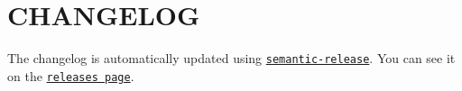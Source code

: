 \chapter{CHANGELOG }
\hypertarget{md__c_1_2_users_2saket_2_one_drive_2_desktop_2e_pathshala_2epathshala-_web_2node__modules_2babel887a031c2d65df9e233e1c16221b35d1}{}\label{md__c_1_2_users_2saket_2_one_drive_2_desktop_2e_pathshala_2epathshala-_web_2node__modules_2babel887a031c2d65df9e233e1c16221b35d1}
\label{md__c_1_2_users_2saket_2_one_drive_2_desktop_2e_pathshala_2epathshala-_web_2node__modules_2babel887a031c2d65df9e233e1c16221b35d1_autotoc_md10318}%
%


The changelog is automatically updated using \href{https://github.com/semantic-release/semantic-release}{\texttt{semantic-\/release}}. You can see it on the \href{../../releases}{\texttt{releases page}}. 